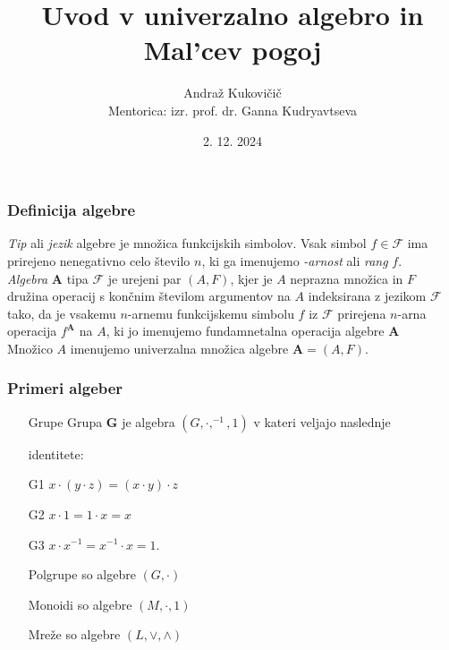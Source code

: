 \documentclass{beamer}
\title{Uvod v univerzalno algebro in Mal'cev pogoj}
\author{Andraž Kukovičič \\[5mm]{\small Mentorica: izr. prof. dr. Ganna Kudryavtseva \\}}
\institute{Fakulteta za matematiko in fiziko}
\date{2. 12. 2024}
\newcommand{\FF}{$\mathcal{F}$ }
\begin{document}
\frame{\titlepage}

\begin{frame}
\frametitle{Definicija algebre}

\emph{Tip} ali \emph{jezik} algebre je množica  funkcijskih simbolov. Vsak simbol $f \in 
\mathcal{F}$ ima prirejeno nenegativno celo število $n$, ki ga imenujemo \emph{-arnost} ali 
\emph{rang} $f$. \\
\emph{Algebra} $\mathbf{A}$ tipa $\mathcal{F}$ je urejeni par $ \left(A, F\right)$, kjer je $A$ neprazna množica 
in $F$ družina operacij s končnim številom argumentov na $A$ indeksirana z jezikom \FF tako, 
da je vsakemu $n$-arnemu funkcijskemu simbolu $f$ iz \FF prirejena $n$-arna operacija $f^\mathbf{A}$ 
na $A$, ki jo imenujemo fundamnetalna operacija algebre $\mathbf{A}$ \\
Množico $A$ imenujemo univerzalna množica algebre $\mathbf{A}  = \left(A, F\right)$. \\
\end{frame}

\begin{frame}
    \frametitle{Primeri algeber}
    \begin{enumerate}
        \item[Grupe] Grupa $\mathbf{G}$ je algebra $\left(G, \cdot, ^{-1}, 1\right)$ v kateri veljajo naslednje
        \item[] identitete:
            \item[G1] $x \cdot \left(y \cdot z\right) = \left(x \cdot y\right) \cdot z$
            \item[G2] $x \cdot 1 = 1 \cdot x = x$
            \item[G3] $x \cdot x^{-1} = x^{-1} \cdot x = 1$.
        \item[Polgrupe] so algebre $\left(G, \cdot\right)$
        \item[Monoidi] so algebre  $\left(M, \cdot, 1\right)$
        \item[Mreže] so algebre $\left(L,\vee, \wedge\right)$ 
    \end{enumerate}
\end{frame}
\end{document}
